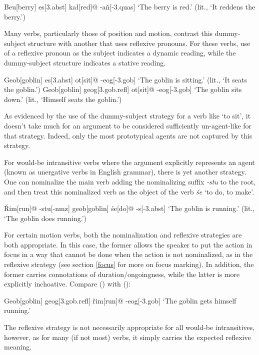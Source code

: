 \documentclass[a4paper,11pt,oneside,openany]{memoir}
\newcommand{\vr}{ř}
\newcommand{\vn}{ň}
\newcommand{\vR}{Ř}
\begin{document}
\ex
\begingl
Beu[berry]
es[\sc 3.abst]
ka\l[red]@
-a\vn[\sc -3.quas]
\glft `The berry is red.' (lit., `It reddens the berry.')
\endgl
\xe

Many verbs, particularly those of position and motion, contrast this dummy-subject structure with another that uses reflexive pronouns. For these verbs, use of a reflexive pronoun as the subject indicates a dynamic reading, while the dummy-subject structure indicates a stative reading.

\pex
\a
\begingl
Geob[goblin]
es[\sc 3.abst]
ot[sit]@
-eog[\sc -3.gob]
\glft `The goblin is sitting.' (lit., `It seats the goblin.')
\endgl
\a
\begingl
Geob[goblin]
geog[\sc 3.gob.refl]
ot[sit]@
-eog[\sc -3.gob]
\glft `The goblin sits down.' (lit., `Himself seats the goblin.')
\endgl
\xe

As evidenced by the use of the dummy-subject strategy for a verb like `to sit', it doesn't take much for an argument to be considered sufficiently un-agent-like for that strategy. Indeed, only the most prototypical agents are not captured by this strategy.

For would-be intransitive verbs where the argument explicitly represents an agent (known as unergative verbs in English grammar), there is yet another strategy. One can nominalize the main verb adding the nominalizing suffix \textit{-stu} to the root, and then treat this nominalized verb as the object of the verb \textit{\'se} `to do, to make'.

\ex
\begingl
\vR im[run]@
-stu[\sc -nmz]
geob[goblin]
\'se[do]@
-s[\sc -3.abst]
\glft  `The goblin is running.' (lit., `The goblin does running.')
\endgl
\xe

For certain motion verbs, both the nominalization and reflexive strategies are both appropriate. In this case, the former allows the speaker to put the action in focus in a way that cannot be done when the action is not nominalized, as in the reflexive strategy (see section \ref{focus} for more on focus marking). In addition, the former carries connotations of duration/ongoingness, while the latter is more explicitly inchoative. Compare (\lastx) with (\nextx):

\ex
\begingl
Geob[goblin]
geog[\sc 3.gob.refl]
\vr im[run]@
-eog[\sc -3.gob]
\glft `The goblin gets himself running.'
\endgl
\xe

The reflexive strategy is not necessarily appropriate for all would-be intransitives, however, as for many (if not most) verbs, it simply carries the expected reflexive meaning.
\end{document}
